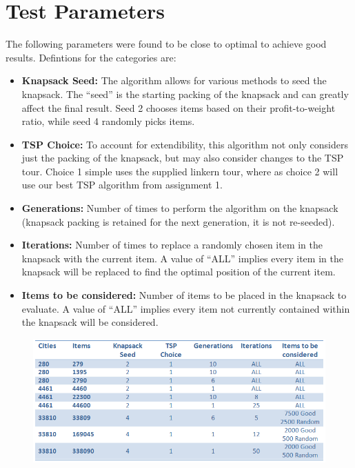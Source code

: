 \documentclass[a4paper,12pt]{article}
\begin{document}
\section{Test Parameters}
The following parameters were found to be close to optimal to achieve good results. Defintions for the categories are:
\begin{itemize}
	\item {\bf Knapsack Seed:} The algorithm allows for various methods to seed the knapsack. The ``seed'' is the starting packing of the knapsack and can greatly affect the final result. Seed 2 chooses items based on their profit-to-weight ratio, while seed 4 randomly picks items.
	\item {\bf TSP Choice:} To account for extendibility, this algorithm not only considers just the packing of the knapsack, but may also consider changes to the TSP tour. Choice 1 simple uses the supplied linkern tour, where as choice 2 will use our best TSP algorithm from assignment 1.
	\item {\bf Generations:} Number of times to perform the algorithm on the knapsack (knapsack packing is retained for the next generation, it is not re-seeded).
	\item {\bf Iterations:} Number of times to replace a randomly chosen item in the knapsack with the current item. A value of ``ALL'' implies every item in the knapsack will be replaced to find the optimal position of the current item.
	\item {\bf Items to be considered:} Number of items to be placed in the knapsack to evaluate. A value of ``ALL'' implies every item not currently contained within the knapsack will be considered.
\end{itemize}

\begin{figure}[h]
\centering
\includegraphics[width=\linewidth]{ParamsTable.png}
\end{figure}

\newpage
\end{document}
